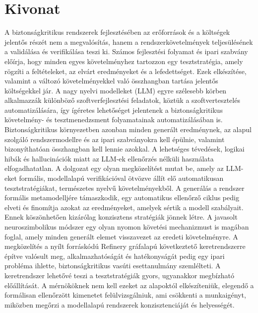 \setcounter{page}{1}

\selecthungarian

\chapter*{Kivonat}

A biztonságkritikus rendszerek fejlesztésében az erőforrások és a költségek jelentős részét nem a megvalósítás, hanem a rendszerkövetelmények teljesülésének a 
validálása és verifikálása teszi ki. Számos fejlesztési folyamat és ipari szabvány előírja, hogy minden egyes követelményhez tartozzon egy tesztstratégia, amely 
rögzíti a feltételeket, az elvárt eredményeket és a lefedettséget. Ezek elkészítése, valamint a változó követelményekkel való összhangban tartása jelentős költségekkel 
jár. A nagy nyelvi modelleket (LLM) egyre szélesebb körben alkalmazzák különböző szoftverfejlesztési feladatok, köztük a szoftvertesztelés automatizálására, így 
ígéretes lehetőséget jelentenek a biztonságkritikus követelmény- és tesztmenedzsment folyamatainak automatizálásában is. Biztonságkritikus környezetben azonban minden 
generált eredménynek, az alapul szolgáló rendszermodellre és az ipari szabványokra kell épülnie, valamint bizonyíthatóan összhangban kell lennie azokkal. A lehetséges 
tévedések, logikai hibák és hallucinációk miatt az LLM-ek ellenőrzés nélküli használata elfogadhatatlan. A dolgozat egy olyan megközelítést mutat be, amely az LLM-eket 
formális, modellalapú verifikációval ötvözve állít elő automatikusan tesztstratégiákat, természetes nyelvű követelményekből. A generálás a rendszer formális 
metamodelljére támaszkodik, egy automatikus ellenőrző ciklus pedig elveti és finomítja azokat az eredményeket, amelyek sértik a modell szabályait. Ennek köszönhetően 
kizárólag konzisztens stratégiák jönnek létre. A javasolt neuroszimbolikus módszer egy olyan nyomon követési mechanizmust is magában foglal, amely minden generált 
elemet visszavezet az eredeti követelményre. A megközelítés a nyílt forráskódú Refinery gráfalapú következtető keretrendszerre építve valósult meg, alkalmazhatóságát 
és hatékonyságát pedig egy ipari probléma ihlette, biztonságkritikus vasúti esettanulmány szemlélteti. A keretrendszer lehetővé teszi a tesztstratégiák gyors, 
ugyanakkor megbízható előállítását. A mérnököknek nem kell ezeket az alapoktól elkészíteniük, elegendő a formálisan ellenőrzött kimenetet felülvizsgálniuk, ami 
csökkenti a munkaigényt, miközben megőrzi a modellalapú rendszerek konzisztenciáját és helyességét.

